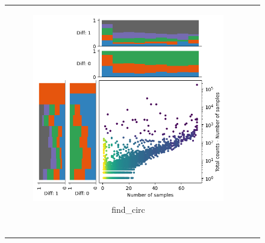 \begin{figure}[ht]
\begin{tabular}{cc}
\begin{subfigure}{.4\textwidth}
            \includegraphics[width=\linewidth]{chapters/4_results_and_discussion/figures/detection/density/find_circ.png}
            \caption{find\_circ}
            \label{fig:detection_density_find-circ}
        \end{subfigure} \\
        \begin{subfigure}{.4\textwidth}
            \centering


\end{subfigure}
\end{tabular}
\end{figure}
